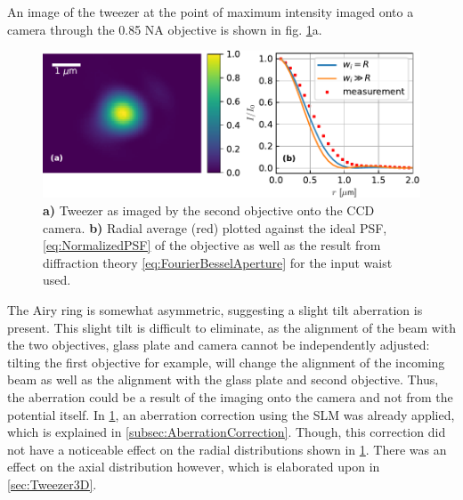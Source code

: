 An image of the tweezer at the point of maximum intensity imaged onto a camera through the 0.85 NA objective is shown in fig. \ref{fig:2Dresults}a. 
\begin{figure}
    \centering
    \includegraphics[width=\linewidth]{figures/AzimuthalAverageSpotZoomed.pdf}
    \caption{\textsf{\textbf{a)}} Tweezer as imaged by the second objective onto the CCD camera. 
	\textsf{\textbf{b)}} Radial average (red) plotted against the ideal \ac{PSF}, \cref{eq:NormalizedPSF} of the objective as well as the result from diffraction theory \cref{eq:FourierBesselAperture} for the input waist used.}
    \label{fig:2Dresults}
\end{figure}
The Airy ring is somewhat asymmetric, suggesting a slight tilt aberration is present.
This slight tilt is difficult to eliminate, as the alignment of the beam with the two objectives, glass plate and camera cannot be independently adjusted: tilting the first objective for example, will change the alignment of the incoming beam as well as the alignment with the glass plate and second objective.
Thus, the aberration could be a result of the imaging onto the camera and not from the potential itself.
In \cref{fig:2Dresults}, an aberration correction using the \ac{SLM} was already applied, which is explained in \cref{subsec:AberrationCorrection}. 
Though, this correction did not have a noticeable effect on the radial distributions shown in \cref{fig:2Dresults}.
There was an effect on the axial distribution however, which is elaborated upon in \cref{sec:Tweezer3D}.


